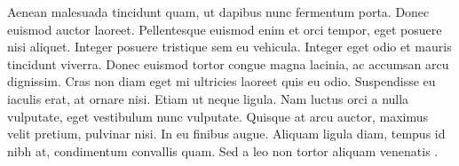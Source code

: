 Aenean malesuada tincidunt quam, ut dapibus nunc fermentum porta. Donec euismod auctor laoreet. Pellentesque euismod enim et orci tempor, eget posuere nisi aliquet. Integer posuere tristique sem eu vehicula. Integer eget odio et mauris tincidunt viverra. Donec euismod tortor congue magna lacinia, ac accumsan arcu dignissim. Cras non diam eget mi ultricies laoreet quis eu odio. Suspendisse eu iaculis erat, at ornare nisi. Etiam ut neque ligula. Nam luctus orci a nulla vulputate, eget vestibulum nunc vulputate. Quisque at arcu auctor, maximus velit pretium, pulvinar nisi. In eu finibus augue. Aliquam ligula diam, tempus id nibh at, condimentum convallis quam. Sed a leo non tortor aliquam venenatis \cite{L67}. 